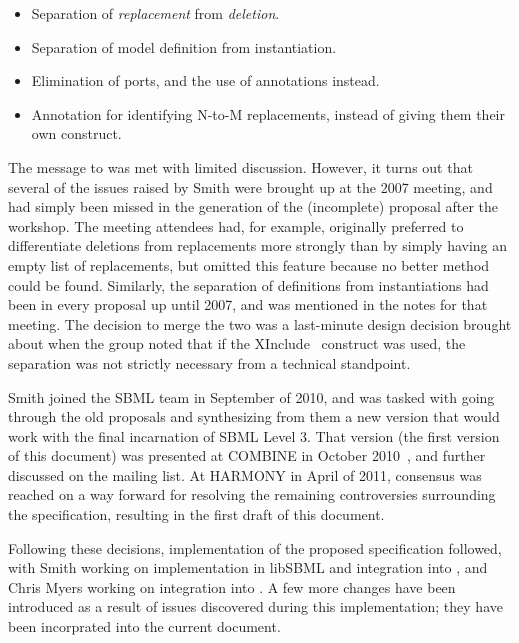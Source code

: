 \begin{itemize}\setlength{\parskip}{0ex}

\item Separation of \emph{replacement} from \emph{deletion}.

\item Separation of model definition from instantiation.

\item Elimination of ports, and the use of annotations instead.

\item Annotation for identifying N-to-M replacements, instead of giving
  them their own construct.

\end{itemize}

The message to 
was met with limited discussion.  However, it turns out that several of
the issues raised by Smith were brought up at the 2007 meeting, and had
simply been missed in the generation of the (incomplete) proposal after
the workshop.  The meeting attendees had, for example, originally
preferred to differentiate deletions from replacements more strongly
than by simply having an empty list of replacements, but omitted this
feature because no better method could be found.  Similarly, the
separation of definitions from instantiations had been in every proposal
up until 2007, and was mentioned in the notes for that meeting.  The
decision to merge the two was a last-minute design decision brought
about when the group noted that if the XInclude~\citep{xinclude}
construct was used, the separation was not strictly necessary from a
technical standpoint.

Smith joined the SBML team in September of 2010, and was tasked with
going through the old proposals and synthesizing from them a new version
that would work with the final incarnation of SBML Level 3.  That
version (the first version of this document) was presented at COMBINE in
October 2010~\citep{smith:2010c}, and further discussed on the
 mailing list.
At HARMONY in April of 2011, consensus was reached on a way forward for
resolving the remaining controversies surrounding the specification,
resulting in the first draft of this document.

Following these decisions, implementation of the proposed specification
followed, with Smith working on implementation in libSBML and integration
into , and Chris Myers 
working on integration into .  
A few more changes have been introduced as a result of issues discovered
during this implementation; they have been incorprated into the current
document.


